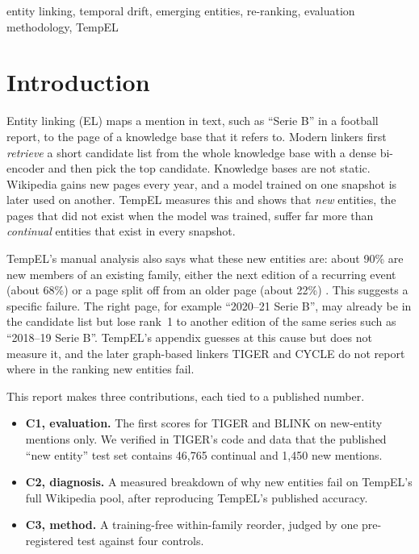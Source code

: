 \documentclass[conference]{IEEEtran}
\begin{document}
\begin{IEEEkeywords}
entity linking, temporal drift, emerging entities, re-ranking, evaluation methodology, TempEL
\end{IEEEkeywords}

\section{Introduction}

Entity linking (EL) maps a mention in text, such as ``Serie B'' in a football report, to the page of a
knowledge base that it refers to. Modern linkers first \emph{retrieve} a short candidate list from the
whole knowledge base with a dense bi-encoder \cite{blink} and then pick the top candidate.
Knowledge bases are not static. Wikipedia gains new pages every year, and a model trained on one
snapshot is later used on another. TempEL \cite{tempel} measures this and shows that \emph{new}
entities, the pages that did not exist when the model was trained, suffer far more than
\emph{continual} entities that exist in every snapshot.

TempEL's manual analysis also says what these new entities are: about 90\% are new members of an
existing family, either the next edition of a recurring event (about 68\%) or a page split off from an
older page (about 22\%) \cite{tempel}. This suggests a specific failure. The right page, for example
``2020--21 Serie B'', may already be in the candidate list but lose rank~1 to another edition of the
same series such as ``2018--19 Serie B''. TempEL's appendix guesses at this cause but does not measure
it, and the later graph-based linkers TIGER \cite{tiger} and CYCLE \cite{cycle} do not report where in
the ranking new entities fail.

This report makes three contributions, each tied to a published number.
\begin{itemize}
\item \textbf{C1, evaluation.} The first scores for TIGER and BLINK on new-entity mentions only.
We verified in TIGER's code and data that the published ``new entity'' test set contains 46,765
continual and 1,450 new mentions.
\item \textbf{C2, diagnosis.} A measured breakdown of why new entities fail on TempEL's full Wikipedia
pool, after reproducing TempEL's published accuracy.
\item \textbf{C3, method.} A training-free within-family reorder, judged by one pre-registered test
against four controls.
\end{itemize}
\end{document}
